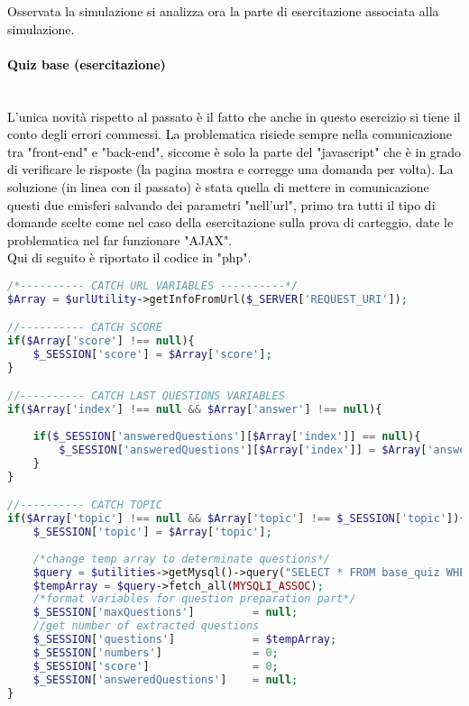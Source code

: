 \textcolor{black}{Osservata la simulazione si analizza ora la parte di esercitazione associata alla simulazione.}\\

\paragraph{\textcolor{black}{Quiz base (esercitazione)}}\leavevmode\\
\textcolor{black}{L'unica novità rispetto al passato è il fatto che anche in questo esercizio si tiene il conto degli errori commessi. La problematica risiede sempre nella comunicazione tra "front-end" e "back-end", siccome è solo la parte del "javascript" che è in grado di verificare le risposte (la pagina mostra e corregge una domanda per volta). La soluzione (in linea con il passato) è stata quella di mettere in comunicazione questi due emisferi salvando dei parametri "nell'url", primo tra tutti il tipo di domande scelte come nel caso della esercitazione sulla prova di carteggio, date le problematica nel far funzionare "AJAX".\\
Qui di seguito è riportato il codice in "php".}\\

\begin{lstlisting}[language=php]
/*---------- CATCH URL VARIABLES ----------*/
$Array = $urlUtility->getInfoFromUrl($_SERVER['REQUEST_URI']);

//---------- CATCH SCORE
if($Array['score'] !== null){
	$_SESSION['score'] = $Array['score'];
}

//---------- CATCH LAST QUESTIONS VARIABLES
if($Array['index'] !== null && $Array['answer'] !== null){
	
	if($_SESSION['answeredQuestions'][$Array['index']] == null){
		$_SESSION['answeredQuestions'][$Array['index']] = $Array['answer']; 
	} 
}

//---------- CATCH TOPIC 
if($Array['topic'] !== null && $Array['topic'] !== $_SESSION['topic']){
	$_SESSION['topic'] = $Array['topic'];
	
	/*change temp array to determinate questions*/
	$query = $utilities->getMysql()->query("SELECT * FROM base_quiz WHERE (topic = '{$Array['topic']}')");
	$tempArray = $query->fetch_all(MYSQLI_ASSOC);
	/*format variables for question preparation part*/
	$_SESSION['maxQuestions']         = null;
	//get number of extracted questions
	$_SESSION['questions']            = $tempArray;
	$_SESSION['numbers']              = 0;
	$_SESSION['score']                = 0;
	$_SESSION['answeredQuestions']    = null;
}
\end{lstlisting}

